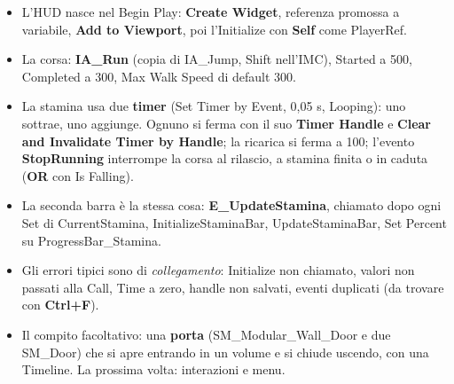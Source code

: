 \begin{itemize}
  \item L'HUD nasce nel Begin Play: \textbf{Create Widget}, referenza promossa a variabile,
        \textbf{Add to Viewport}, poi l'Initialize con \textbf{Self} come PlayerRef.
  \item La corsa: \textbf{IA\_Run} (copia di IA\_Jump, Shift nell'IMC), Started a 500,
        Completed a 300, Max Walk Speed di default 300.
  \item La stamina usa due \textbf{timer} (Set Timer by Event, 0,05 s, Looping): uno
        sottrae, uno aggiunge. Ognuno si ferma con il suo \textbf{Timer Handle} e
        \textbf{Clear and Invalidate Timer by Handle}; la ricarica si ferma a 100;
        l'evento \textbf{StopRunning} interrompe la corsa al rilascio, a stamina finita o
        in caduta (\textbf{OR} con Is Falling).
  \item La seconda barra è la stessa cosa: \textbf{E\_UpdateStamina}, chiamato dopo ogni
        Set di CurrentStamina, InitializeStaminaBar, UpdateStaminaBar, Set Percent su
        ProgressBar\_Stamina.
  \item Gli errori tipici sono di \emph{collegamento}: Initialize non chiamato, valori non
        passati alla Call, Time a zero, handle non salvati, eventi duplicati (da trovare con
        \textbf{Ctrl+F}).
  \item Il compito facoltativo: una \textbf{porta} (SM\_Modular\_Wall\_Door e due SM\_Door)
        che si apre entrando in un volume e si chiude uscendo, con una Timeline. La
        prossima volta: interazioni e menu.
\end{itemize}
